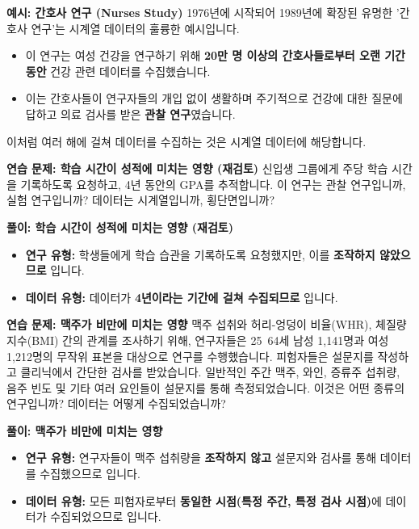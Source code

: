 \documentclass[11pt,a4paper]{article}
\begin{document}
\begin{examplebox}
\textbf{예시: 간호사 연구 (Nurses Study)}
1976년에 시작되어 1989년에 확장된 유명한 '간호사 연구'는 시계열 데이터의 훌륭한 예시입니다.
\begin{itemize}
    \item 이 연구는 여성 건강을 연구하기 위해 \textbf{20만 명 이상의 간호사들로부터 오랜 기간 동안} 건강 관련 데이터를 수집했습니다.
    \item 이는 간호사들이 연구자들의 개입 없이 생활하며 주기적으로 건강에 대한 질문에 답하고 의료 검사를 받은 \textbf{관찰 연구}였습니다.
\end{itemize}
이처럼 여러 해에 걸쳐 데이터를 수집하는 것은 시계열 데이터에 해당합니다.
\end{examplebox}

\begin{practicebox}
\textbf{연습 문제: 학습 시간이 성적에 미치는 영향 (재검토)}
신입생 그룹에게 주당 학습 시간을 기록하도록 요청하고, 4년 동안의 GPA를 추적합니다.
이 연구는 관찰 연구입니까, 실험 연구입니까? 데이터는 시계열입니까, 횡단면입니까?
\end{practicebox}

\begin{solutionbox}
\textbf{풀이: 학습 시간이 성적에 미치는 영향 (재검토)}
\begin{itemize}
    \item \textbf{연구 유형:} 학생들에게 학습 습관을 기록하도록 요청했지만, 이를 \textbf{조작하지 않았으므로} 입니다.
    \item \textbf{데이터 유형:} 데이터가 \textbf{4년이라는 기간에 걸쳐 수집되므로} 입니다.
\end{itemize}
\end{solutionbox}

\begin{practicebox}
\textbf{연습 문제: 맥주가 비만에 미치는 영향}
맥주 섭취와 허리-엉덩이 비율(WHR), 체질량 지수(BMI) 간의 관계를 조사하기 위해, 연구자들은 25~64세 남성 1,141명과 여성 1,212명의 무작위 표본을 대상으로 연구를 수행했습니다. 피험자들은 설문지를 작성하고 클리닉에서 간단한 검사를 받았습니다. 일반적인 주간 맥주, 와인, 증류주 섭취량, 음주 빈도 및 기타 여러 요인들이 설문지를 통해 측정되었습니다.
이것은 어떤 종류의 연구입니까? 데이터는 어떻게 수집되었습니까?
\end{practicebox}

\begin{solutionbox}
\textbf{풀이: 맥주가 비만에 미치는 영향}
\begin{itemize}
    \item \textbf{연구 유형:} 연구자들이 맥주 섭취량을 \textbf{조작하지 않고} 설문지와 검사를 통해 데이터를 수집했으므로 입니다.
    \item \textbf{데이터 유형:} 모든 피험자로부터 \textbf{동일한 시점(특정 주간, 특정 검사 시점)}에 데이터가 수집되었으므로 입니다.
\end{itemize}
\end{solutionbox}
\end{document}
